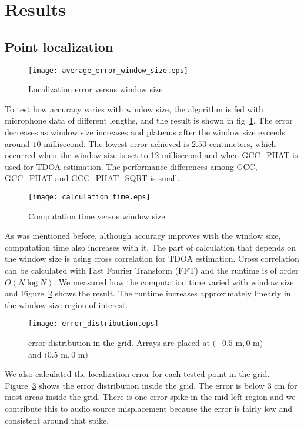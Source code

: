 \section{Results}
\subsection{Point localization}
\begin{figure}[h!]
\centering
\texttt{[image: average\_error\_window\_size.eps]}
\caption{Localization error versus window size}
\label{fig:accuracy_vs_window}
\end{figure}
To test how accuracy varies with window size, the algorithm is fed with microphone data of different lengths, and the result is shown in fig~\ref{fig:accuracy_vs_window}. The error decreases as window size increases and plateaus after the window size exceeds around $10$ millisecond. The lowest error achieved is $2.53$ centimeters, which occurred when the window size is set to 12 millisecond and when GCC\_PHAT is used for TDOA estimation. The performance differences among GCC, GCC\_PHAT and GCC\_PHAT\_SQRT is small.

\begin{figure}[h!]
\centering
\texttt{[image: calculation\_time.eps]}
\caption{Computation time versus window size}
\label{fig:speed_vs_window}
\end{figure}
As was mentioned before, although accuracy improves with the window size, computation time also increases with it. The part of calculation that depends on the window size is using cross correlation for TDOA estimation. Cross correlation can be calculated with Fast Fourier Transform (FFT) and the runtime is of order $O(N\log N)$. We measured how the computation time varied with window size and Figure~\ref{fig:speed_vs_window} shows the result. The runtime increases approximately linearly in the window size region of interest.

\begin{figure}[h!]
\centering
\texttt{[image: error\_distribution.eps]}
\caption{error distribution in the grid. Arrays are placed at $(-0.5$ m$, 0$ m$)$ and $(0.5$ m$, 0$ m$)$}
\label{fig:error_distribution}
\end{figure}
We also calculated the localization error for each tested point in the grid. Figure~\ref{fig:error_distribution} shows the error distribution inside the grid. The error is below $3$ cm for most areas inside the grid. There is one error spike in the mid-left region and we contribute this to audio source misplacement because the error is fairly low and consistent around that spike.

